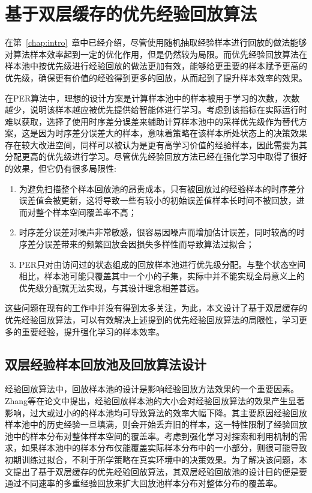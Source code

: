 
\chapter{基于双层缓存的优先经验回放算法}\label{chap:dper}

在第~\ref{chap:intro}~章中已经介绍，尽管使用随机抽取经验样本进行回放的做法能够对算法样本效率起到一定的优化作用，但是仍然较为局限。而优先经验回放算法在样本池中按优先级进行经验回放的做法更加有效，能够给更重要的样本赋予更高的优先级，确保更有价值的经验得到更多的回放，从而起到了提升样本效率的效果。

在PER算法中，理想的设计方案是计算样本池中的样本被用于学习的次数，次数越少，说明该样本越应被优先提供给智能体进行学习。考虑到该指标在实际运行时难以获取，选择了使用时序差分误差来辅助计算样本池中的采样优先级作为替代方案，这是因为时序差分误差大的样本，意味着策略在该样本所处状态上的决策效果存在较大改进空间，同样可以被认为是更有高学习价值的经验样本，因此需要为其分配更高的优先级进行学习。尽管优先经验回放方法已经在强化学习中取得了很好的效果，但它仍有很多局限性:

\begin{enumerate}[1）]
    \item 为避免扫描整个样本回放池的昂贵成本，只有被回放过的经验样本的时序差分误差值会被更新，这将导致一些有较小的初始误差值样本长时间不被回放，进而对整个样本空间覆盖率不高；
    \item 时序差分误差对噪声非常敏感，很容易因噪声而增加估计误差，同时较高的时序差分误差带来的频繁回放会因损失多样性而导致算法过拟合；
    \item PER只对由访问过的状态组成的回放样本池进行优先级分配。与整个状态空间相比，样本池可能只覆盖其中一个小的子集，实际中并不能实现全局意义上的优先级分配就无法实现，与其设计理念相差甚远。
\end{enumerate}

这些问题在现有的工作中并没有得到太多关注，为此，本文设计了基于双层缓存的优先经验回放算法，可以有效解决上述提到的优先经验回放算法的局限性，学习更多的重要经验，提升强化学习的样本效率。

\section{双层经验样本回放池及回放算法设计}

经验回放算法中，回放样本池的设计是影响经验回放方法效果的一个重要因素。Zhang等\cite{zhang2017deeper}在论文中提出，经验回放样本池的大小会对经验回放算法的效果产生显著影响，过大或过小的的样本池均可导致算法的效率大幅下降。其主要原因经验回放样本池中的历史经验一旦填满，则会开始丢弃旧的样本，这一特性限制了经验回放池中的样本分布对整体样本空间的覆盖率。考虑到强化学习对探索和利用机制的需求，如果样本池中的样本分布仅能覆盖实际样本分布中的一小部分，则很可能导致初期训练过拟合，不利于所学策略在真实环境中的决策效果。为了解决该问题，本文提出了基于双层缓存的优先经验回放算法，其双层经验回放池的设计目的便是要通过不同速率的多重经验回放来扩大回放池样本分布对整体分布的覆盖率。

